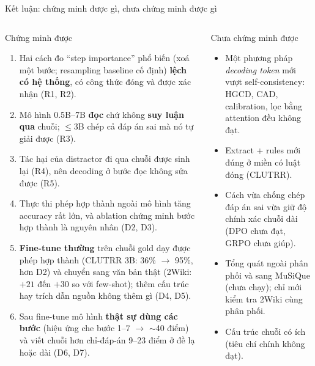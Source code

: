 \documentclass[aspectratio=169,t]{beamer}
\begin{document}
\begin{frame}[shrink]{Kết luận: chứng minh được gì, chưa chứng minh được gì}
\begin{columns}[T,onlytextwidth]
\begin{block}{Chứng minh được}
\scriptsize
\begin{enumerate}
  \setlength{\itemsep}{3pt}
  \item Hai cách đo ``step importance'' phổ biến (xoá một bước; resampling baseline cố định) \textbf{lệch có hệ thống}, có công thức đóng và được xác nhận (R1, R2).
  \item Mô hình 0.5B--7B \textbf{đọc} chứ không \textbf{suy luận qua} chuỗi; $\le$3B chép cả đáp án sai mà nó tự giải được (R3).
  \item Tác hại của distractor đi qua chuỗi được sinh lại (R4), nên decoding ở bước đọc không sửa được (R5).
  \item Thực thi phép hợp thành ngoài mô hình tăng accuracy rất lớn, và ablation chứng minh bước hợp thành là nguyên nhân (D2, D3).
  \item \textbf{Fine-tune thường} trên chuỗi gold dạy được phép hợp thành (CLUTRR 3B: 36\% $\to$ 95\%, hơn D2) và chuyển sang văn bản thật (2Wiki: $+21$ đến $+30$ so với few-shot); thêm cấu trúc hay trích dẫn nguồn không thêm gì (D4, D5).
  \item Sau fine-tune mô hình \textbf{thật sự dùng các bước} (hiệu ứng che bước 1--7 $\to$ $\sim$40 điểm) và viết chuỗi hơn chỉ-đáp-án 9--23 điểm ở đề lạ hoặc dài (D6, D7).
\end{enumerate}
\end{block}
\begin{block}{Chưa chứng minh được}
\scriptsize
\begin{itemize}
  \setlength{\itemsep}{3pt}
  \item Một phương pháp \emph{decoding token} mới vượt self-consistency: HGCD, CAD, calibration, lọc bằng attention đều không đạt.
  \item Extract + rules mới đúng ở miền có luật đóng (CLUTRR).
  \item Cách vừa chống chép đáp án sai vừa giữ độ chính xác chuỗi dài (DPO chưa đạt, GRPO chưa giúp).
  \item Tổng quát ngoài phân phối và sang MuSiQue (chưa chạy); chỉ mới kiểm tra 2Wiki cùng phân phối.
  \item Cấu trúc chuỗi có ích (tiêu chí chính không đạt).

\end{itemize}
\end{block}
\end{columns}
\end{frame}
\end{document}
